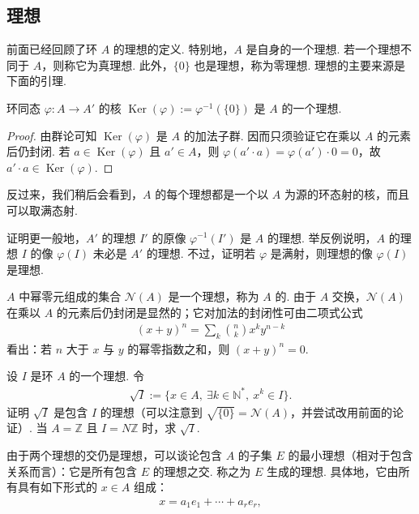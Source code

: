 \subsection{理想}\label{sec:galois-1-2-8}
前面已经回顾了环 $A$ 的理想的定义. 特别地，$A$ 是自身的一个理想. 若一个理想不同于 $A$，则称它为真理想. 此外，$\{0\}$ 也是理想，称为零理想. 理想的主要来源是下面的引理.
\begin{lemma*}
环同态 $\varphi\colon A\longrightarrow A'$ 的核 $\operatorname{Ker}(\varphi):=\varphi^{-1}(\{0\})$ 是 $A$ 的一个理想.
\end{lemma*}
\begin{proof}
由群论可知 $\operatorname{Ker}(\varphi)$ 是 $A$ 的加法子群. 因而只须验证它在乘以 $A$ 的元素后仍封闭. 若 $a\in\operatorname{Ker}(\varphi)$ 且 $a'\in A$，则 $\varphi(a'\cdot a)=\varphi(a')\cdot0=0$，故 $a'\cdot a\in\operatorname{Ker}(\varphi)$.
\end{proof}
反过来，我们稍后会看到，$A$ 的每个理想都是一个以 $A$ 为源的环态射的核，而且可以取满态射.
\begin{exercise*}
证明更一般地，$A'$ 的理想 $I'$ 的原像 $\varphi^{-1}(I')$ 是 $A$ 的理想. 举反例说明，$A$ 的理想 $I$ 的像 $\varphi(I)$ 未必是 $A'$ 的理想. 不过，证明若 $\varphi$ 是满射，则理想的像 $\varphi(I)$ 是理想.
\end{exercise*}
\begin{example*}[{幂零根}]
$A$ 中幂零元组成的集合 $\mathcal N(A)$ 是一个理想，称为 $A$ 的. 由于 $A$ 交换，$\mathcal N(A)$ 在乘以 $A$ 的元素后仍封闭是显然的；它对加法的封闭性可由二项式公式
\begin{align*}
(x+y)^n=\sum_k\binom nk x^ky^{n-k}
\end{align*}
看出：若 $n$ 大于 $x$ 与 $y$ 的幂零指数之和，则 $(x+y)^n=0$.
\end{example*}
\begin{exercise*}[{理想的根}]
设 $I$ 是环 $A$ 的一个理想. 令
\begin{align*}
\sqrt I:=\{x\in A,\ \exists k\in\mathbb N^*,\ x^k\in I\}.
\end{align*}
证明 $\sqrt I$ 是包含 $I$ 的理想（可以注意到 $\sqrt{\{0\}}=\mathcal N(A)$，并尝试改用前面的论证）. 当 $A=\mathbb Z$ 且 $I=N\mathbb Z$ 时，求 $\sqrt I$.
\end{exercise*}
由于两个理想的交仍是理想，可以谈论包含 $A$ 的子集 $E$ 的最小理想（相对于包含关系而言）：它是所有包含 $E$ 的理想之交. 称之为 $E$ 生成的理想. 具体地，它由所有具有如下形式的 $x\in A$ 组成：
\begin{align*}
x=a_1e_1+\cdots+a_re_r,
\end{align*}
